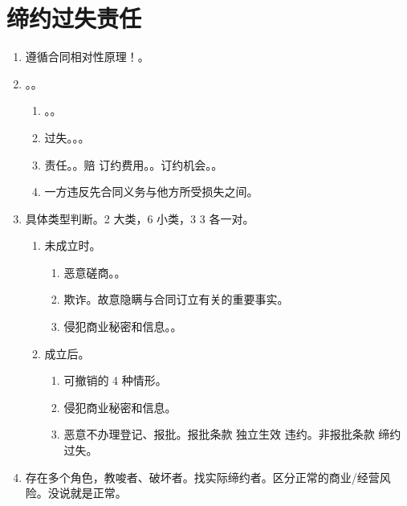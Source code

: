\section{缔约过失责任}
\begin{enumerate}
  \item 遵循合同相对性原理！。
  \item {}。。
        \begin{enumerate}
          \item {}。。
          \item 过失。。。
          \item 责任。。赔 \yi 订约费用。。\er 订约机会。。
          \item 一方违反先合同义务与他方所受损失之间。
        \end{enumerate}
  \item 具体类型判断。2 大类，6 小类，3 3 各一对。
        \begin{enumerate}
          \item 未成立时。
                \begin{enumerate}
                  \item 恶意磋商。。
                  \item 欺诈。故意隐瞒与合同订立有关的重要事实。
                  \item 侵犯商业秘密和信息。。
                \end{enumerate}
          \item 成立后。
                \begin{enumerate}
                  \item 可撤销的 4 种情形。
                  \item 侵犯商业秘密和信息。
                  \item 恶意不办理登记、报批。\yi 报批条款 \yjt 独立生效 \yjt 违约。\er 非报批条款 \yjt 缔约过失。
                \end{enumerate}
        \end{enumerate}
  \item \yi 存在多个角色，教唆者、破坏者。找实际缔约者。\er 区分正常的商业/经营风险。没说就是正常。
\end{enumerate}
